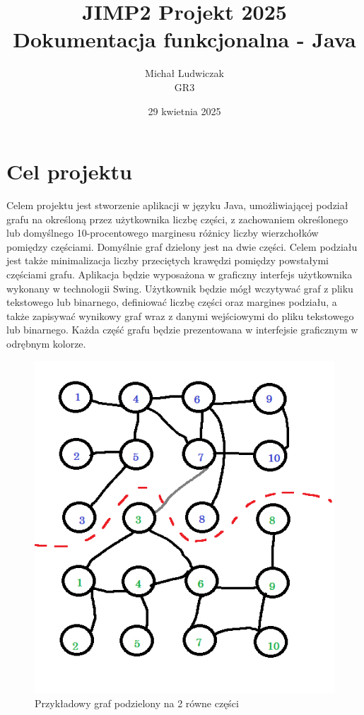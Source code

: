 \documentclass{article}
\title{\Huge JIMP2 Projekt 2025 \\ {\huge Dokumentacja funkcjonalna - Java}}
\author{Michał Ludwiczak \\ GR3}
\date{29 kwietnia 2025}
\begin{document}
\maketitle

\tableofcontents



\section{Cel projektu}

    Celem projektu jest stworzenie aplikacji w języku Java, umożliwiającej podział grafu na określoną przez użytkownika liczbę części, z zachowaniem określonego lub domyślnego 10-procentowego marginesu różnicy liczby wierzchołków pomiędzy częściami. Domyślnie graf dzielony jest na dwie części. Celem podziału jest także minimalizacja liczby przeciętych krawędzi pomiędzy powstałymi częściami grafu. 
    Aplikacja będzie wyposażona w graficzny interfejs użytkownika wykonany w technologii Swing. Użytkownik będzie mógł wczytywać graf z pliku tekstowego lub binarnego, definiować liczbę części oraz margines podziału, a także zapisywać wynikowy graf wraz z danymi wejściowymi do pliku tekstowego lub binarnego. 
    Każda część grafu będzie prezentowana w interfejsie graficznym w odrębnym kolorze.
    
    \begin{figure}[H]
        \centering
        \includegraphics[width=0.75\linewidth]{img/graph.png}
        \caption{Przykładowy graf podzielony na 2 równe części}
        \label{fig:graph}
    \end{figure}
\end{document}
